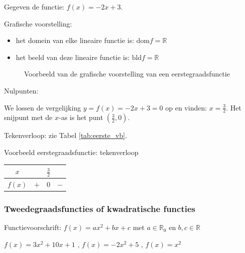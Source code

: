 \begin{voorbeeld}
	Gegeven de functie: $f(x)=-2x+3$.
	

Grafische voorstelling:
\begin{itemize}
\item het domein van elke lineaire functie is: $\textrm{dom}f=\mathbb{R}$
\item het beeld van deze lineaire functie is: $\textrm{bld}f=\mathbb{R}$
\end{itemize}



\begin{figure}[H]
	\centering          
	
	\caption{Voorbeeld van de grafische voorstelling van een eerstegraadsfunctie}
	\label{fig:eerstegraadsfunctie_3}	
\end{figure}


Nulpunten:

We lossen de vergelijking $y=f(x)=-2x+3=0$ op en vinden:
$x=\frac{3}{2}$. Het snijpunt met de $x$-as is het punt $(\frac{3}{2},0)$.

Tekenverloop: zie Tabel \ref{tab:eerste_vb}.

\begin{tabel}{Voorbeeld eerstegraadsfunctie: tekenverloop}
\begin{tabular}{c||c|c|c}
	$x$ &  & $\frac{3}{2}$ & \\
	\hline 
	$f(x)$ & $+$ & 0 & $-$\\
\end{tabular}
\label{tab:eerste_vb}	
\end{tabel}

\end{voorbeeld}

\subsubsection{Tweedegraadsfuncties of kwadratische functies}



\begin{definitie}
	Functievoorschrift: $f(x)=ax^{2}+bx+c$ met $a\in\mathbb{R}_{0}$
en $b,c\in\mathbb{R}$ 

\end{definitie}

\begin{voorbeeld}
	$f(x)=3x^{2}+10x+1$ , $f(x)=-2x^{2}+5$
, $f(x)=x^{2}$
\end{voorbeeld}

